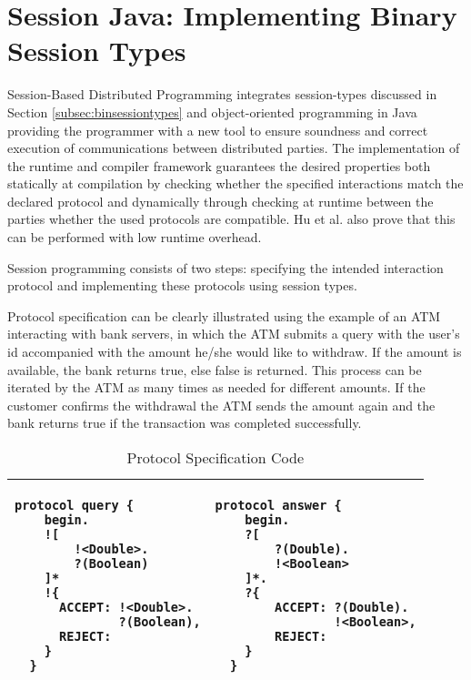 		
\section{Session Java: Implementing Binary Session Types}
\label{sec:sessionj}
	
Session-Based Distributed Programming integrates session-types discussed in Section \ref{subsec:binsessiontypes} and object-oriented programming in Java providing the programmer with a new tool to ensure soundness and correct execution of communications between distributed parties. The implementation of the runtime and compiler framework guarantees the desired properties both statically at compilation by checking whether the specified interactions match the declared protocol and dynamically through checking at runtime between the parties whether the used protocols are compatible. Hu et al. \cite{sessionbased_programming} also prove that this can be performed with low runtime overhead.

Session programming consists of two steps: specifying the intended interaction protocol and implementing these protocols using session types.

Protocol specification can be clearly illustrated using the example of an ATM interacting with bank servers, in which the ATM submits a query with the user's id accompanied with the amount he/she would like to withdraw. If the amount is available, the bank returns true, else false is returned. This process can be iterated by the ATM as many times as needed for different amounts. If the customer confirms the withdrawal the ATM sends the amount again and the bank returns true if the transaction was completed successfully.

\begin{table}[H]
\center
\caption{Protocol Specification Code}
\begin{tabular}{|l|l|}
\hline

  \begin{lstlisting}[basicstyle=\LISTINGSTYLE]
  protocol query {
    begin.
    ![
        !<Double>.
        ?(Boolean)
    ]*
    !{
      ACCEPT: !<Double>.
              ?(Boolean),
      REJECT:
    }
  }
  \end{lstlisting}
  &
  \begin{lstlisting}[basicstyle=\LISTINGSTYLE]
  protocol answer {
    begin.
    ?[
        ?(Double).
        !<Boolean>
    ]*.
    ?{
        ACCEPT: ?(Double).
                !<Boolean>,
        REJECT:
    }
  }
  \end{lstlisting}\\
  \hline
  
\end{tabular}
\label{CODEprotocol}
\end{table}

